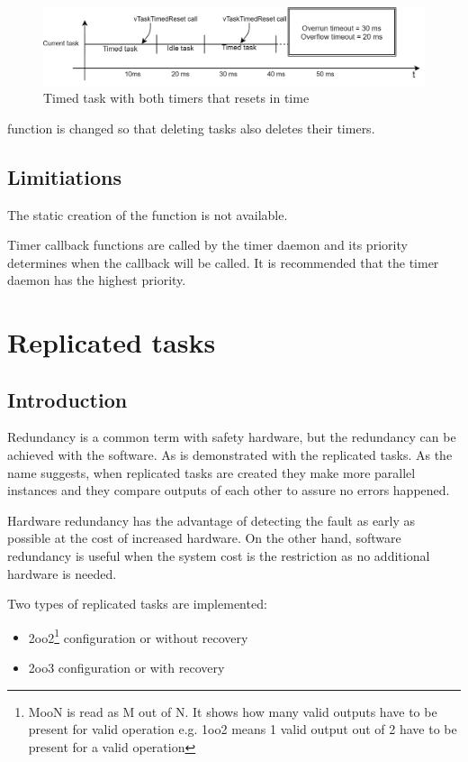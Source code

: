\begin{figure}[H]

      \centering
      \includegraphics[width=\linewidth]{images/timed_example_reset.png}
      \caption{Timed task with both timers that resets in time}
      \label{fig:timed_example_reset}
    
\end{figure}

 function is changed so that deleting tasks also deletes their timers.

\subsection{Limitiations}

The static creation of the function is not available.

Timer callback functions are called by the timer daemon and its priority determines when the callback will be called. It is recommended that the timer daemon has the highest priority.

\section{Replicated tasks}

\subsection{Introduction}

Redundancy is a common term with safety hardware, but the redundancy can be achieved with the software. As is demonstrated with the replicated tasks. As the name suggests, when replicated tasks are created they make more parallel instances and they compare outputs of each other to assure no errors happened. 

Hardware redundancy has the advantage of detecting the fault as early as possible at the cost of increased hardware. On the other hand, software redundancy is useful when the system cost is the restriction as no additional hardware is needed. 

\noindent Two types of replicated tasks are implemented:
\begin{itemize}
    \item 2oo2\footnote{MooN is read as M out of N. It shows how many valid outputs have to be present for valid operation e.g. 1oo2 means 1 valid output out of 2 have to be present for a valid operation} configuration or without recovery
    \item 2oo3 configuration or with recovery
\end{itemize}


